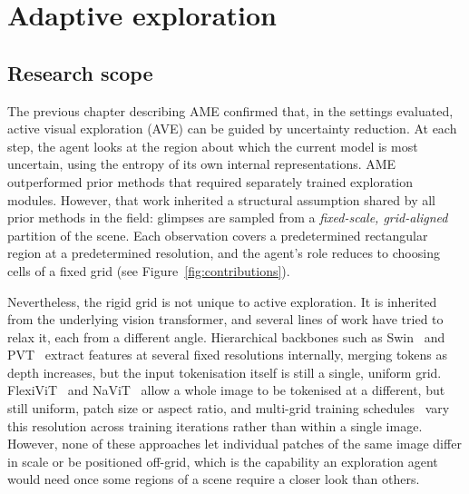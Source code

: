 \chapter{Adaptive exploration}
\label{chap:adaptive}

\section{Research scope}
\label{sec:adaptive-scope}

The previous chapter describing AME confirmed that, in the settings evaluated, active visual exploration (AVE) can be guided by uncertainty reduction. At each step, the agent looks at the region about which the current model is most uncertain, using the entropy of its own internal representations. AME outperformed prior methods that required separately trained exploration modules. However, that work inherited a structural assumption shared by all prior methods in the field: glimpses are sampled from a \emph{fixed-scale, grid-aligned} partition of the scene. Each observation covers a predetermined rectangular region at a predetermined resolution, and the agent's role reduces to choosing cells of a fixed grid (see Figure~\ref{fig:contributions}).

Nevertheless, the rigid grid is not unique to active exploration. It is inherited from the underlying vision transformer, and several lines of work have tried to relax it, each from a different angle. Hierarchical backbones such as Swin~\cite{liu2021Swin} and PVT~\cite{wang2021pyramid} extract features at several fixed resolutions internally, merging tokens as depth increases, but the input tokenisation itself is still a single, uniform grid. FlexiViT~\cite{beyer2023flexivit} and NaViT~\cite{dehghani2024patch} allow a whole image to be tokenised at a different, but still uniform, patch size or aspect ratio, and multi-grid training schedules~\cite{li2021efficient,wu2020multigrid} vary this resolution across training iterations rather than within a single image. However, none of these approaches let individual patches of the same image differ in scale or be positioned off-grid, which is the capability an exploration agent would need once some regions of a scene require a closer look than others.

